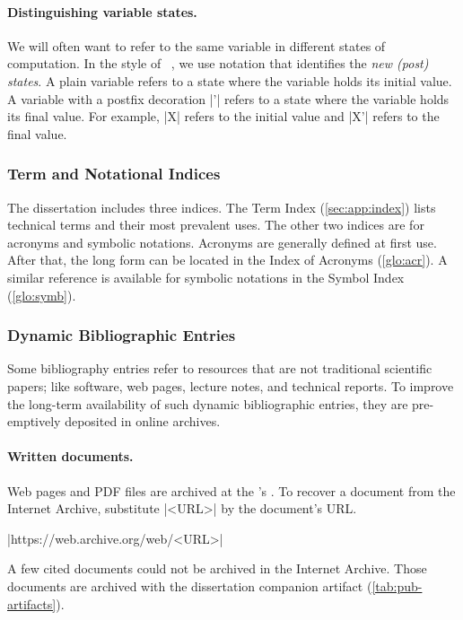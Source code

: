 \paragraph*{Distinguishing variable states.}
We will often want to refer to the same variable in different states of
computation. In the style of ~\cite{spivey1992},
we use notation that identifies the \emph{new (post) states}. A plain variable
refers to a state where the variable holds its {initial} value. A variable with
a postfix decoration \pr|'| refers to a state where the variable holds its
{final} value. For example, \pr|X| refers to the initial value and \pr|X'|
refers to the final value.

\subsubsection{Term and Notational Indices}

The dissertation includes three indices. The Term Index
(\autoref{sec:app:index}) lists technical terms and their most prevalent uses.
The other two indices are for acronyms and symbolic notations. Acronyms are
generally defined at first use. After that, the long form can be located in the
Index of Acronyms (\autoref{glo:acr}). A similar reference is available for
symbolic notations in the Symbol Index (\autoref{glo:symb}).

\subsubsection{Dynamic Bibliographic Entries}

Some bibliography entries refer to resources that are not traditional scientific
papers; like software, web pages, lecture notes, and technical reports. To
improve the long-term availability of such dynamic bibliographic entries, they
are pre-emptively deposited in online archives.

\paragraph*{Written documents.}
Web pages and PDF files are archived at the 's
. To recover a document from the Internet Archive,
substitute \pr|<URL>| by the document's URL.
\begin{center}\pr|https://web.archive.org/web/<URL>|\end{center}
A few cited documents could not be archived in the Internet Archive.
Those documents are archived with the dissertation companion artifact
(\autoref{tab:pub-artifacts}).

